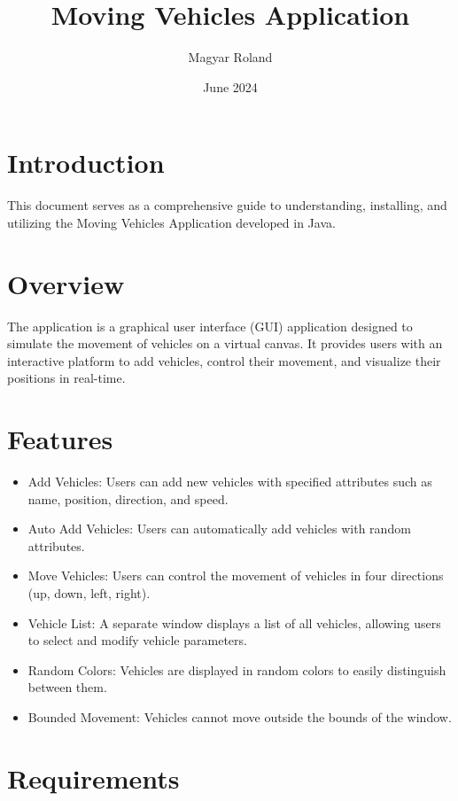 \documentclass{article}
\title{Moving Vehicles Application}
\author{Magyar Roland}
\date{June 2024}
\begin{document}
\maketitle

\section{Introduction}

This document serves as a comprehensive guide to understanding, installing, and utilizing the Moving Vehicles Application developed in Java.

\section{Overview}

The application is a graphical user interface (GUI) application designed to simulate the movement of vehicles on a virtual canvas. It provides users with an interactive platform to add vehicles, control their movement, and visualize their positions in real-time.

\section{Features}

\begin{itemize}
    \item Add Vehicles: Users can add new vehicles with specified attributes such as name, position, direction, and speed.
    \item Auto Add Vehicles: Users can automatically add vehicles with random attributes.
    \item Move Vehicles: Users can control the movement of vehicles in four directions (up, down, left, right).
    \item Vehicle List: A separate window displays a list of all vehicles, allowing users to select and modify vehicle parameters.
    \item Random Colors: Vehicles are displayed in random colors to easily distinguish between them.
    \item Bounded Movement: Vehicles cannot move outside the bounds of the window.
\end{itemize}

\section{Requirements}
\end{document}
